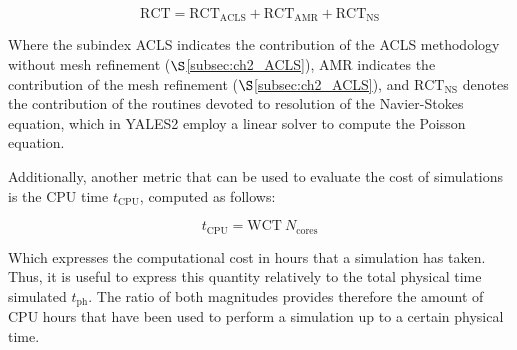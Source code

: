 \begin{equation}
\mathrm{RCT} = \mathrm{RCT}_\mathrm{ACLS} + \mathrm{RCT}_\mathrm{AMR} + \mathrm{RCT}_\mathrm{NS}
\end{equation}

Where the subindex ACLS indicates the contribution of the ACLS methodology without mesh refinement ($\S$\ref{subsec:ch2_ACLS}), AMR indicates the contribution of the mesh refinement ($\S$\ref{subsec:ch2_ACLS}), and $\mathrm{RCT}_\mathrm{NS}$ denotes the contribution of the routines devoted to resolution of the Navier-Stokes equation, which in YALES2 employ a linear solver to compute the Poisson equation.

Additionally, another metric that can be used to evaluate the cost of simulations is the CPU time $t_\mathrm{CPU}$, computed as follows:

\begin{equation}
t_\mathrm{CPU} = \mathrm{WCT} ~ N_\mathrm{cores}
\end{equation}

Which expresses the computational cost in hours that a simulation has taken. Thus, it is useful to express this quantity relatively to the total physical time simulated $t_\mathrm{ph}$. The ratio of both magnitudes provides therefore the amount of CPU hours that have been used to perform a simulation up to a certain physical time.

